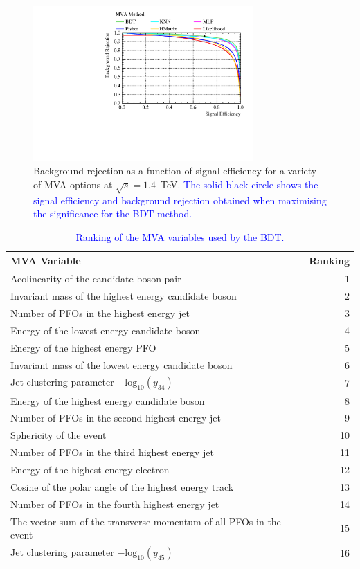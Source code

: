 \begin{figure}
\centering
\includegraphics[width=0.75\textwidth]{PhysicsAnalysis/Plots/MVAPlots/1400GeV/ThesisPlotMVAAlternatives1400GeV.pdf}
\caption[Background rejection as a function of signal efficiency for a variety of MVA options at $\sqrt{s}=1.4$~TeV.]{Background rejection as a function of signal efficiency for a variety of MVA options at $\sqrt{s}=1.4$~TeV.  \textcolor{blue}{The solid black circle shows the signal efficiency and background rejection obtained when maximising the significance for the BDT method.}}
\label{fig:mvaalternatives1400GeV}
\end{figure}

\begin{table}[h!]
\centering
\begin{tabular}{ l r }
\hline
MVA Variable & Ranking \\
\hline
Acolinearity of the candidate boson pair & 1 \\
Invariant mass of the highest energy candidate boson & 2 \\
Number of PFOs in the highest energy jet & 3 \\
Energy of the lowest energy candidate boson & 4 \\
Energy of the highest energy PFO & 5 \\
Invariant mass of the lowest energy candidate boson & 6 \\
Jet clustering parameter $-\text{log}_{10}(y_{34})$ & 7 \\
Energy of the highest energy candidate boson & 8 \\
Number of PFOs in the second highest energy jet & 9 \\
Sphericity of the event & 10 \\
Number of PFOs in the third highest energy jet & 11 \\
Energy of the highest energy electron & 12 \\
Cosine of the polar angle of the highest energy track & 13 \\
Number of PFOs in the fourth highest energy jet & 14 \\
The vector sum of the transverse momentum of all PFOs in the event & 15 \\
Jet clustering parameter $-\text{log}_{10}(y_{45})$ & 16 \\
\hline
\end{tabular}
\caption[Ranking of the MVA variables used by the BDT.]{\textcolor{blue}{Ranking of the MVA variables used by the BDT.}}
\label{table:mvaranking1400GeV}
\end{table}

